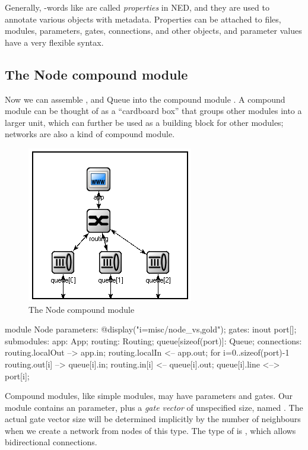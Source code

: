 Generally, -words like  are called \textit{properties}
in NED, and they are used to annotate various objects
with metadata. Properties can be attached to files, modules, parameters, gates,
connections, and other objects, and parameter values have a very flexible
syntax.


\subsection{The Node compound module}

Now we can assemble ,  and {Queue} into the
compound module . A compound module can be thought of as
a ``cardboard box'' that groups other modules into a larger unit,
which can further be used as a building block for other modules;
networks are also a kind of compound module.

\begin{figure}[htbp]
  \centering
  \includegraphics[scale=0.6]{figures/ned-routing-node}
  \caption{The Node compound module}
  \label{fig:ned-routing-node}
\end{figure}

\begin{ned}
module Node
{
    parameters:
        @display("i=misc/node_vs,gold");
    gates:
        inout port[];
    submodules:
        app: App;
        routing: Routing;
        queue[sizeof(port)]: Queue;
    connections:
        routing.localOut --> app.in;
        routing.localIn <-- app.out;
        for i=0..sizeof(port)-1 {
            routing.out[i] --> queue[i].in;
            routing.in[i] <-- queue[i].out;
            queue[i].line <--> port[i];
        }
}
\end{ned}

Compound modules, like simple modules, may have parameters and gates.
Our  module contains an  parameter, plus a
\textit{gate vector} of unspecified size, named .
The actual gate vector size will be determined implicitly by the number
of neighbours when we create a network from nodes of this type.
The type of  is , which allows bidirectional
connections.

